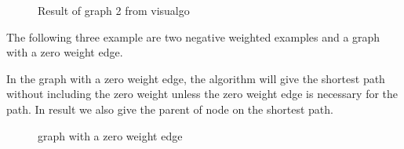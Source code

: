 \documentclass[11pt]{article}  %
\begin{document}
\begin{figure}[htbp]
{}
\quad
{}
\caption{ Result of graph 2 from visualgo}
\end{figure}\par

\clearpage

The following three example are two negative weighted examples and a graph with a zero weight edge.\par

In the graph with a zero weight edge, the algorithm will give the shortest path without including the zero weight unless the zero weight edge is necessary for the path. In result we also give the parent of node on the shortest path.\par

\begin{figure}[htbp]
\centering
{}
\quad
{}
\caption{ graph with a zero weight edge}
\end{figure}\par
\end{document}
